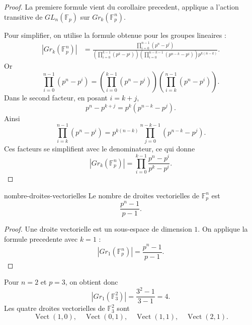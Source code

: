 \begin{proof}
    La premiere formule vient du corollaire precedent, applique a l'action
    transitive de $GL_n(\mathbb{F}_p)$ sur $Gr_k(\mathbb{F}_p^n)$.

    Pour simplifier, on utilise la formule obtenue pour les groupes lineaires :
    \[
    \begin{aligned}
        |Gr_k(\mathbb{F}_p^n)|
        &=
        \frac{\prod_{i=0}^{n-1}(p^n-p^i)}
        {\left(\prod_{i=0}^{k-1}(p^k-p^i)\right)
        \left(\prod_{i=0}^{n-k-1}(p^{n-k}-p^i)\right)
        p^{k(n-k)}}.
    \end{aligned}
    \]
    Or
    \[
        \prod_{i=0}^{n-1}(p^n-p^i)
        =
        \left(\prod_{i=0}^{k-1}(p^n-p^i)\right)
        \left(\prod_{i=k}^{n-1}(p^n-p^i)\right).
    \]
    Dans le second facteur, en posant $i=k+j$,
    \[
        p^n-p^{k+j}=p^k(p^{n-k}-p^j).
    \]
    Ainsi
    \[
        \prod_{i=k}^{n-1}(p^n-p^i)
        =
        p^{k(n-k)}\prod_{j=0}^{n-k-1}(p^{n-k}-p^j).
    \]
    Ces facteurs se simplifient avec le denominateur, ce qui donne
    \[
        |Gr_k(\mathbb{F}_p^n)|
        =
        \prod_{i=0}^{k-1}\frac{p^n-p^i}{p^k-p^i}.
    \]
\end{proof}

\begin{corollaire}{}{nombre-droites-vectorielles}
    Le nombre de droites vectorielles de $\mathbb{F}_p^n$ est
    \[
        \frac{p^n-1}{p-1}.
    \]
\end{corollaire}

\begin{proof}
    Une droite vectorielle est un sous-espace de dimension $1$. On applique la
    formule precedente avec $k=1$ :
    \[
        |Gr_1(\mathbb{F}_p^n)|
        =
        \frac{p^n-1}{p-1}.
    \]
\end{proof}

Pour $n=2$ et $p=3$, on obtient donc
\[
    |Gr_1(\mathbb{F}_3^2)|=\frac{3^2-1}{3-1}=4.
\]
Les quatre droites vectorielles de $\mathbb{F}_3^2$ sont
\[
    \operatorname{Vect}(1,0),\quad
    \operatorname{Vect}(0,1),\quad
    \operatorname{Vect}(1,1),\quad
    \operatorname{Vect}(2,1).
\]

